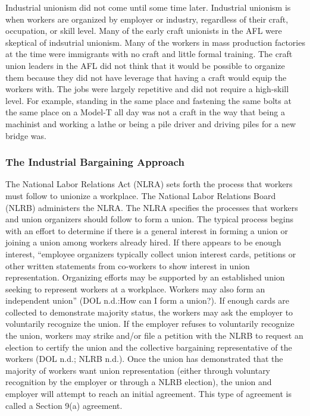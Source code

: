 Industrial unionism did not come until some time later. Industrial unionism is when workers are organized by employer or industry, regardless of their craft, occupation, or skill level. Many of the early craft unionists in the AFL were skeptical of indsutrial unionism. Many of the workers in mass production factories at the time were immigrants with no craft and little formal training. The craft union leaders in the AFL did not think that it would be possible to organize them because they did not have leverage that having a craft would equip the workers with. The jobs were largely repetitive and did not require a high-skill level. For example, standing in the same place and fastening the same bolts at the same place on a Model-T all day was not a craft in the way that being a machinist and working a lathe or being a pile driver and driving piles for a new bridge was.

\subsubsection{The Industrial Bargaining Approach}

The National Labor Relations Act (NLRA) sets forth the process that workers must follow to unionize a workplace. The National Labor Relations Board (NLRB) administers the NLRA. The NLRA specifies the processes that workers and union organizers should follow to form a union. The typical process begins with an effort to determine if there is a general interest in forming a union or joining a union among workers already hired. If there appears to be enough interest, “employee organizers typically collect union interest cards, petitions or other written statements from co-workers to show interest in union representation. Organizing efforts may be supported by an established union seeking to represent workers at a workplace. Workers may also form an independent union” (DOL n.d.:How can I form a union?). If enough cards are collected to demonstrate majority status, the workers may ask the employer to voluntarily recognize the union. If the employer refuses to voluntarily recognize the union, workers may strike and/or file a petition with the NLRB to request an election to certify the union and the collective bargaining representative of the workers (DOL n.d.; NLRB n.d.). Once the union has demonstrated that the majority of workers want union representation (either through voluntary recognition by the employer or through a NLRB election), the union and employer will attempt to reach an initial agreement. This type of agreement is called a Section 9(a) agreement.

